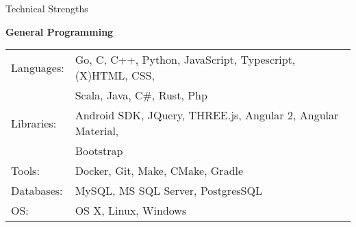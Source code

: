 \documentclass{resume} %
\newcommand{\btab}[2]{
	\bgroup
	\def\arraystretch{#1}
	\begin{tabular}{#2}
}
\newcommand{\etab}{
	\end{tabular} \smallskip
	\egroup
}
\begin{document}
\begin{rSection}{Technical Strengths}

{\bf General Programming}

\btab{1.1}{ l l }
	Languages: &  Go, C, C++, Python, JavaScript, Typescript, (X)HTML, CSS, \\
	& Scala, Java, C\#, Rust, Php \\
	Libraries: & Android SDK, JQuery, THREE.js, Angular 2, Angular Material, \\
	& Bootstrap \\
	Tools: & Docker, Git, Make, CMake, Gradle \\
	Databases: & MySQL, MS SQL Server, PostgresSQL \\
	OS: & OS X, Linux, Windows \\
\etab

\end{rSection}
\end{document}
